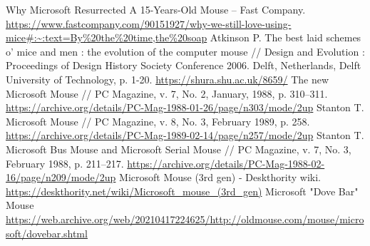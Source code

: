 \documentclass[11pt, a4paper]{article}
\begin{document}
\begin{thebibliography}{9}
 Why Microsoft Resurrected A 15-Years-Old Mouse -- Fast Company. \url{https://www.fastcompany.com/90151927/why-we-still-love-using-mice#:~:text=By%20the%20time,the%20soap}
 Atkinson P. The best laid schemes o’ mice and men : the evolution of the computer mouse // Design and Evolution : Proceedings of Design History Society Conference 2006. Delft, Netherlands, Delft University of Technology, p. 1-20. \url{https://shura.shu.ac.uk/8659/}
 The new Microsoft Mouse // PC Magazine, v. 7, No. 2, January, 1988, p. 310--311. \url{https://archive.org/details/PC-Mag-1988-01-26/page/n303/mode/2up}
 Stanton T. Microsoft Mouse // PC Magazine, v. 8, No. 3, February 1989, p. 258. \url{https://archive.org/details/PC-Mag-1989-02-14/page/n257/mode/2up}
 Stanton T. Microsoft Bus Mouse and Microsoft Serial Mouse // PC Magazine, v. 7, No. 3, February 1988, p. 211--217. \url{https://archive.org/details/PC-Mag-1988-02-16/page/n209/mode/2up}
 Microsoft Mouse (3rd gen) - Deskthority wiki. \url{https://deskthority.net/wiki/Microsoft_mouse_(3rd_gen)}
 Microsoft "Dove Bar" Mouse \url{https://web.archive.org/web/20210417224625/http://oldmouse.com/mouse/microsoft/dovebar.shtml}
\end{thebibliography}
\end{document}
